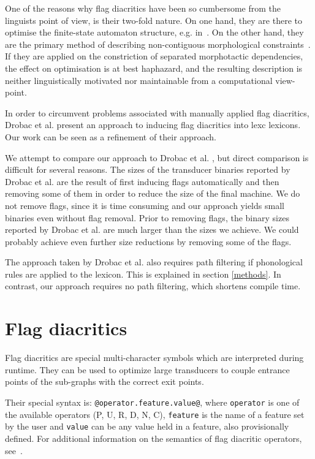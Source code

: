 \documentclass[11pt]{article}
\begin{document}
One of the reasons why flag diacritics have been so cumbersome from
the linguists point of view, is their two-fold nature. On one hand,
they are there to optimise the finite-state automaton structure,
e.g. in~\cite{karttunen2006numbers}. On the other hand, they are the
primary method of describing non-contiguous morphological
constraints~\cite{beesley1998constraining}. If they are applied on the
constriction of separated morphotactic dependencies, the effect on
optimisation is at best haphazard, and the resulting description is
neither linguistically motivated nor maintainable from a computational
view-point.

In order to circumvent problems associated with manually applied flag
diacritics, Drobac et al.  present an approach
to inducing flag diacritics into lexc lexicons. Our work can be seen
as a refinement of their approach.

We attempt to compare our approach to Drobac et
al. , but direct comparison is difficult for
several reasons. The sizes of the transducer binaries reported by
Drobac et al.  are the result of first inducing
flags automatically and then removing some of them in order to reduce
the size of the final machine. We do not remove flags, since it is
time consuming and our approach yields small binaries even without
flag removal. Prior to removing flags, the binary sizes reported by
Drobac et al.  are much larger than the sizes we
achieve. We could probably achieve even further size reductions by
removing some of the flags.

The approach taken by Drobac et al.  also
requires path filtering if phonological rules are applied to the
lexicon. This is explained in section \ref{methods}. In contrast, our
approach requires no path filtering, which shortens compile time.

\section{Flag diacritics}
\label{sec:flags}

Flag diacritics are special multi-character symbols which are interpreted during runtime. They can be used to optimize large transducers to couple entrance points of the sub-graphs with the correct exit points.

Their special syntax is: \verb+@operator.feature.value@+, where
\texttt{operator} is one of the available operators (P, U, R, D, N, C), \texttt{feature} is the name of a feature set by the user and \texttt{value} can be any value held in a feature, also provisionally defined. For additional information on the semantics of flag diacritic operators, see~.
\end{document}
